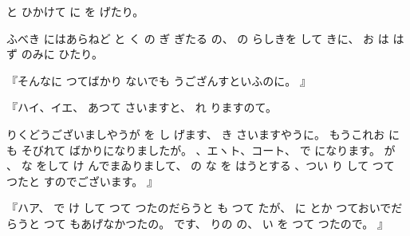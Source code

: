 と
ひかけて
に
を
げたり。

ふべき
にはあらねど
と
く
の
ぎ
ぎたる
の、
の
らしきを
して
きに、
お
は
はず
のみに
ひたり。

『そんなに
つてばかり
ないでも
うござんすといふのに。
』

『ハイ、イエ、
あつて
さいますと、
れ
りますのて。

りくどうございましやうが
を
し
げます、
き
さいますやうに。
もうこれお
にも
そびれて
ばかりになりましたが。
、エヽト、コート、
で
になります。
が
、
な
をして
け
んでまゐりまして、
の
な
を
はうとする
、つい
り
して
つて
つたと
すのでございます。
』

『ハア、
で
け
して
つて
つたのだらうと
も
つて
たが、
に
とか
つておいでだらうと
つて
もあげなかつたの。
です、
りの
の、
い
を
つて
つたので。
』

